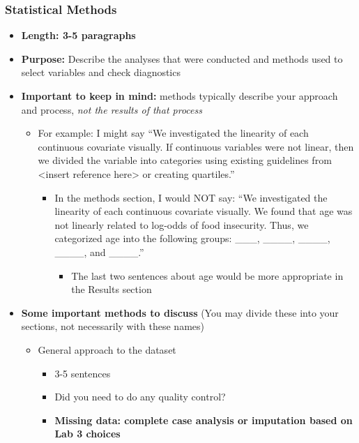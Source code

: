 \documentclass[
  letterpaper,
  DIV=11,
  numbers=noendperiod]{scrartcl}
\providecommand{\tightlist}{%
  \setlength{\itemsep}{0pt}\setlength{\parskip}{0pt}}\usepackage{longtable,booktabs,array}
\begin{document}
\hypertarget{statistical-methods}{%
\subsubsection{Statistical Methods}\label{statistical-methods}}

\begin{itemize}
\tightlist
\item
  \textbf{Length: 3-5 paragraphs}
\item
  \textbf{Purpose:} Describe the analyses that were conducted and
  methods used to select variables and check diagnostics
\item
  \textbf{Important to keep in mind:} methods typically describe your
  approach and process, \emph{not the results of that process}

  \begin{itemize}
  \tightlist
  \item
    For example: I might say ``We investigated the linearity of each
    continuous covariate visually. If continuous variables were not
    linear, then we divided the variable into categories using existing
    guidelines from \textless insert reference here\textgreater{} or
    creating quartiles.''

    \begin{itemize}
    \tightlist
    \item
      In the methods section, I would NOT say: ``We investigated the
      linearity of each continuous covariate visually. We found that age
      was not linearly related to log-odds of food insecurity. Thus, we
      categorized age into the following groups: \_\_\_, \_\_\_\_,
      \_\_\_\_, \_\_\_\_, and \_\_\_\_.''

      \begin{itemize}
      \tightlist
      \item
        The last two sentences about age would be more appropriate in
        the Results section
      \end{itemize}
    \end{itemize}
  \end{itemize}
\item
  \textbf{Some important methods to discuss} (You may divide these into
  your sections, not necessarily with these names)

  \begin{itemize}
  \tightlist
  \item
    General approach to the dataset

    \begin{itemize}
    \tightlist
    \item
      3-5 sentences
    \item
      Did you need to do any quality control?
    \item
      {\textbf{Missing data: complete case analysis or imputation based
      on Lab 3 choices}}


\end{itemize}
\end{itemize}
\end{itemize}
\end{document}
